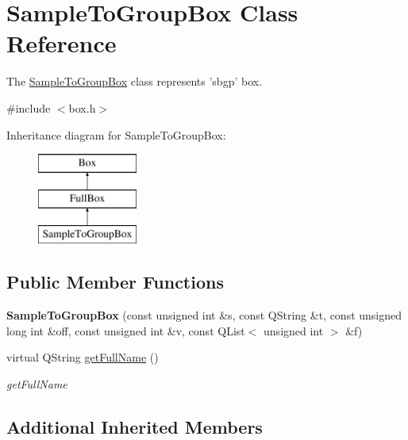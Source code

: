 \hypertarget{class_sample_to_group_box}{\section{Sample\-To\-Group\-Box Class Reference}
\label{class_sample_to_group_box}
}


The \hyperlink{class_sample_to_group_box}{Sample\-To\-Group\-Box} class represents 'sbgp' box.  




{\ttfamily \#include $<$box.\-h$>$}

Inheritance diagram for Sample\-To\-Group\-Box\-:\begin{figure}[H]
\begin{center}
\leavevmode
\includegraphics[height=3.000000cm]{class_sample_to_group_box}
\end{center}
\end{figure}
\subsection*{Public Member Functions}
\begin{DoxyCompactItemize}
\item 
\hypertarget{class_sample_to_group_box_a5883516ad83eaede6aaf5cdff195dd6c}{{\bfseries Sample\-To\-Group\-Box} (const unsigned int \&s, const Q\-String \&t, const unsigned long int \&off, const unsigned int \&v, const Q\-List$<$ unsigned int $>$ \&f)}\label{class_sample_to_group_box_a5883516ad83eaede6aaf5cdff195dd6c}

\item 
virtual Q\-String \hyperlink{class_sample_to_group_box_aa1cabba0625ae5ac6c32b63846e72957}{get\-Full\-Name} ()
\begin{DoxyCompactList}\small\item\em get\-Full\-Name \end{DoxyCompactList}\end{DoxyCompactItemize}
\subsection*{Additional Inherited Members}


